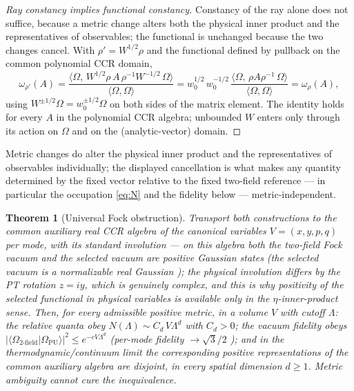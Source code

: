 \documentclass[11pt]{article}
\newtheorem{theorem}{Theorem}[section]
\theoremstyle{definition}
\theoremstyle{remark}
\begin{document}
\begin{proof}[Ray constancy implies functional constancy]
Constancy of the ray alone does not suffice, because a metric change
alters both the physical inner product and the representatives of
observables; the functional is unchanged because the two changes cancel.
With $\rho'=W^{1/2}\rho$ and the functional defined by pullback on the
common polynomial CCR domain,
\begin{equation}
\omega_{\rho'}(A)
=\frac{\langle\Omega,\,W^{1/2}\rho\,A\,\rho^{-1}W^{-1/2}\,\Omega\rangle}
       {\langle\Omega,\Omega\rangle}
=w_0^{1/2}\,w_0^{-1/2}\,
 \frac{\langle\Omega,\,\rho A\rho^{-1}\,\Omega\rangle}
       {\langle\Omega,\Omega\rangle}
=\omega_{\rho}(A),
\end{equation}
using $W^{\pm1/2}\Omega=w_0^{\pm1/2}\Omega$ on both sides of the matrix
element.  The identity holds for every $A$ in the polynomial CCR
algebra; unbounded $W$ enters only through its action on $\Omega$ and on
the (analytic-vector) domain.
\end{proof}

Metric changes do alter the physical inner product and the
representatives of observables individually; the displayed cancellation
is what makes any quantity determined by the fixed vector relative to
the fixed two-field reference --- in particular the occupation
\eqref{eq:N} and the fidelity below --- metric-independent.

\begin{theorem}[Universal Fock obstruction]\label{thm:nogo}
Transport both constructions to the common auxiliary real CCR algebra of
the canonical variables $V=(x,y,p,q)$ per mode, with its standard
involution --- on this algebra both the two-field Fock vacuum and the
selected vacuum are positive Gaussian states (the selected vacuum is a
normalizable real Gaussian \cite{companion2}); the physical involution
differs by the PT rotation $z=iy$, which is genuinely complex, and this
is why positivity of the selected functional in \emph{physical} variables
is available only in the $\eta$-inner-product sense.  Then, for every
admissible positive metric, in a volume $V$ with cutoff
$\Lambda$: the relative quanta obey
$N(\Lambda)\sim C_d\,V\Lambda^d$ with $C_d>0$; the vacuum fidelity obeys
$|\langle\Omega_{2\text{-field}}|\Omega_{\mathrm{PU}}\rangle|^2
\le e^{-cV\Lambda^d}$ (per-mode fidelity $\to\sqrt3/2$
\cite{companion2}); and in the thermodynamic/continuum limit the
corresponding positive representations of the common auxiliary algebra
are disjoint, in every spatial dimension $d\ge1$.
Metric ambiguity cannot cure the inequivalence.
\end{theorem}
\end{document}
